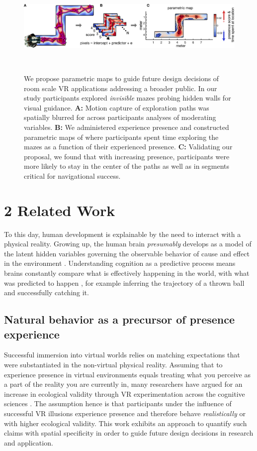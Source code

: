 \begin{figure}[!ht]
\centering
  \includegraphics[width=\linewidth]{figures/fig1.pdf}
  \caption{We propose parametric maps to guide future design decisions of room scale VR applications addressing a broader public. In our study participants explored \textit{invisible} mazes probing hidden walls for visual guidance. \textbf{A:} Motion capture of exploration paths was spatially blurred for across participants analyses of moderating variables. \textbf{B:} We administered experience presence and constructed parametric maps of where participants spent time exploring the mazes as a function of their experienced presence. \textbf{C:} Validating our proposal, we found that with increasing presence, participants were more likely to stay in the center of the paths as well as in segments critical for navigational success.}~\label{fig:methods}
\end{figure}

\section{2 Related Work}
To this day, human development is explainable by the need to interact with a physical reality. Growing up, the human brain \textit{presumably} develops as a model of the latent hidden variables governing the observable behavior of cause and effect in the environment \cite{Friston2010}. Understanding cognition as a predictive process means brains constantly compare what is effectively happening in the world, with what was predicted to happen \cite{Clark2013}, for example inferring the trajectory of a thrown ball and successfully catching it.

\subsection{Natural behavior as a precursor of presence experience}
Successful immersion into virtual worlds relies on matching expectations that were substantiated in the non-virtual physical reality. Assuming that to experience presence in virtual environments equals treating what you perceive as a part of the reality you are currently in, many researchers have argued for an increase in ecological validity through VR experimentation across the cognitive sciences \cite{Bohil2011, Parsons2015, Parsons2017}. The assumption hence is that participants under the influence of successful VR illusions experience presence and therefore behave \textit{realistically} or with higher ecological validity. This work exhibits an approach to quantify such claims with spatial specificity in order to guide future design decisions in research and application.


